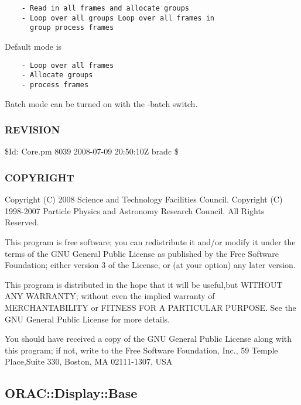 \begin{description}
\begin{enumerate}
\begin{verbatim}
    - Read in all frames and allocate groups
    - Loop over all groups Loop over all frames in
      group process frames
\end{verbatim}


Default mode is

\begin{verbatim}
    - Loop over all frames
    - Allocate groups
    - process frames
\end{verbatim}


Batch mode can be turned on with the -batch switch.

\end{enumerate}
\end{description}
\subsubsection*{REVISION\label{ORAC::Core_REVISION}}


\$Id: Core.pm 8039 2008-07-09 20:50:10Z bradc \$

\subsubsection*{COPYRIGHT\label{ORAC::Core_COPYRIGHT}}


Copyright (C) 2008 Science and Technology Facilities Council.
Copyright (C) 1998-2007 Particle Physics and Astronomy Research
Council. All Rights Reserved.



This program is free software; you can redistribute it and/or modify it under
the terms of the GNU General Public License as published by the Free Software
Foundation; either version 3 of the License, or (at your option) any later
version.



This program is distributed in the hope that it will be useful,but WITHOUT ANY
WARRANTY; without even the implied warranty of MERCHANTABILITY or FITNESS FOR A
PARTICULAR PURPOSE. See the GNU General Public License for more details.



You should have received a copy of the GNU General Public License along with
this program; if not, write to the Free Software Foundation, Inc., 59 Temple
Place,Suite 330, Boston, MA  02111-1307, USA

\subsection{ORAC::Display::Base\label{ORAC::Display::Base}}


